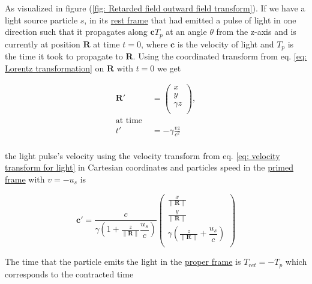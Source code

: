 As visualized in figure (\ref{fig: Retarded field outward field transform}). If we have a light source particle $s$, in its \hyperlink{def-proper-frame}{rest frame} that had emitted a pulse of light in one direction such that it propagates along $\mathbf{c}T_{p}$ at an angle $\theta$ from the z-axis and is currently at position $\mathbf{R}$ at time $t=0$, where $\mathbf{c}$ is the velocity of light and $T_{p}$ is the time it took to propagate to $\mathbf{R}$.
Using the coordinated transform from eq. \eqref{eq: Lorentz transformation} on $\mathbf{R}$ with $t=0$ we get

\begin{equation}
	\label{displacement transform}
	\begin{aligned}
		\mathbf{R}' & =
		\begin{pmatrix}
			x        \\
			y        \\
			\gamma z \\
		\end{pmatrix},                          \\
		\text{at time \ \ \ }                   \\
		t'          & = - \gamma \frac{vz}{c^2} \\
	\end{aligned}
\end{equation}

the light pulse's velocity using the velocity transform from eq. \eqref{eq: velocity transform for light} in Cartesian coordinates and particles speed in the \hyperlink{def-Primed-Frame}{primed frame} with $v=-u_s$ is

\begin{equation}
	\label{light pulse velocity transform}
	\mathbf{c}' =  \dfrac{c}{\gamma\left(1 + \frac{z}{\|\mathbf{R}\|} \dfrac{u_s}{c}  \right)}
	\begin{pmatrix}
		\frac{x}{\|\mathbf{R}\|}                                        \\
		\frac{y}{\|\mathbf{R}\|}                                        \\
		\gamma \left( \frac{z}{\|\mathbf{R}\|} + \dfrac{u_s}{c} \right) \\
	\end{pmatrix}
\end{equation}


The time that the particle emits the light in the \hyperlink{def-proper-frame}{proper frame} is $T_{ret}= - T_{p}$ which corresponds to the contracted time

